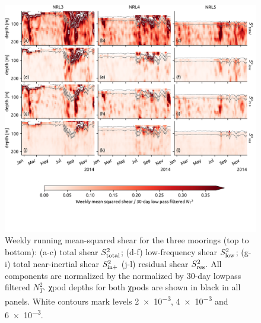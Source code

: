 \documentclass[onecol]{ametsoc}
\begin{document}
\begin{figure}
\centering
\includegraphics[width=\textwidth]{figure5-shears.png}
\caption{\label{fig:shears}
Weekly running mean-squared shear for the three moorings (top to bottom): (a-c) total shear \(S_\text{total}^2\); (d-f) low-frequency shear \(S_\text{low}^2\); (g-i) total near-inertial shear \(S_\text{in+}^2\) (j-l) residual shear \(S_\text{res}^2\). All components are normalized by the normalized by 30-day lowpass filtered \(N^2_T\). χpod depths for both χpods are shown in black in all panels. White contours mark levels \num{2e-3}, \num{4e-3} and \num{6e-3}.}
\end{figure}
\end{document}

